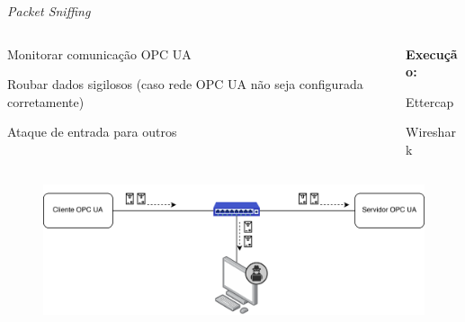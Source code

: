 \documentclass{uspBeamer}
\begin{document}
    \begin{frame}{\textit{Packet Sniffing}}
        \begin{columns}
            \begin{column}{.5\textwidth}
                \begin{wideitemize}
                    \item Monitorar comunicação OPC UA
                    \item Roubar dados sigilosos (caso rede OPC UA não seja configurada corretamente)
                    \item Ataque de entrada para outros
                \end{wideitemize}
            \end{column}
            \begin{column}{.5\textwidth}
                \textbf{Execução:}
                \begin{wideitemize}
                    \item Ettercap
                    \item Wireshark
                \end{wideitemize}
            \end{column}
        \end{columns}
        \begin{figure}
            \includegraphics[width=.7\textwidth]{sniffing.png}
        \end{figure}
    \end{frame}
\end{document}
